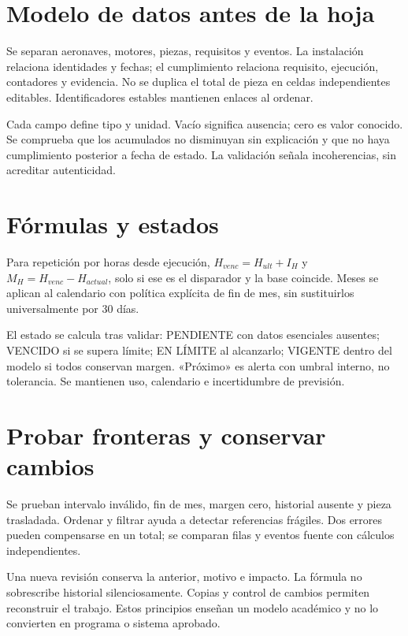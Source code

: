 
\section{Modelo de datos antes de la hoja}
Se separan aeronaves, motores, piezas, requisitos y eventos. La instalación relaciona identidades y fechas; el cumplimiento relaciona requisito, ejecución, contadores y evidencia. No se duplica el total de pieza en celdas independientes editables. Identificadores estables mantienen enlaces al ordenar.

Cada campo define tipo y unidad. Vacío significa ausencia; cero es valor conocido. Se comprueba que los acumulados no disminuyan sin explicación y que no haya cumplimiento posterior a fecha de estado. La validación señala incoherencias, sin acreditar autenticidad.
\section{Fórmulas y estados}
Para repetición por horas desde ejecución, $H_{venc}=H_{ult}+I_H$ y $M_H=H_{venc}-H_{actual}$, solo si ese es el disparador y la base coincide. Meses se aplican al calendario con política explícita de fin de mes, sin sustituirlos universalmente por 30 días.

El estado se calcula tras validar: PENDIENTE con datos esenciales ausentes; VENCIDO si se supera límite; EN LÍMITE al alcanzarlo; VIGENTE dentro del modelo si todos conservan margen. «Próximo» es alerta con umbral interno, no tolerancia. Se mantienen uso, calendario e incertidumbre de previsión.
\section{Probar fronteras y conservar cambios}
Se prueban intervalo inválido, fin de mes, margen cero, historial ausente y pieza trasladada. Ordenar y filtrar ayuda a detectar referencias frágiles. Dos errores pueden compensarse en un total; se comparan filas y eventos fuente con cálculos independientes.

Una nueva revisión conserva la anterior, motivo e impacto. La fórmula no sobrescribe historial silenciosamente. Copias y control de cambios permiten reconstruir el trabajo. Estos principios enseñan un modelo académico y no lo convierten en programa o sistema aprobado.
